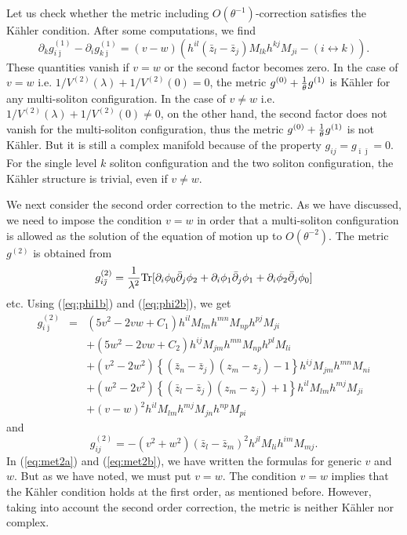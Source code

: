 \documentclass[a4paper,12pt]{article}
\begin{document}
Let us check whether the metric including
$O(\theta^{-1})$-correction
satisfies the K\"ahler condition.
After some computations, we find
\begin{equation}
\partial_{k}g^{(1)}_{i\bar{\jmath}}-\partial_{i} g^{(1)}_{k\bar{\jmath}}
=(v-w)\left( h^{il}(\bar{z}_{l}-\bar{z}_{j})M_{lk}h^{kj}M_{ji}
-(i\leftrightarrow k)
\right) .
\end{equation}
These quantities vanish if $v=w$  or the second factor becomes zero.
In the case of $v=w$ i.e. $1/V^{(2)}(\lambda)+1/V^{(2)}(0)=0$,
the metric $g^{(0)}+{1\over\theta}g^{(1)}$ is K\"ahler
for any multi-soliton configuration.
In the case of $v\neq w$ i.e. $1/V^{(2)}(\lambda)+1/V^{(2)}(0)\neq 0$,
on the other hand,
the second factor does not vanish for the multi-soliton configuration,
thus the metric $g^{(0)}+{1\over\theta}g^{(1)}$ is not K\"ahler.
But it is still a complex manifold because of the property
$g_{ij}=g_{\bar{\imath}\bar{\jmath}}=0$.
For the single level $k$ soliton configuration
and the two soliton configuration,
the K\"ahler structure is trivial,
even if $v\neq w$.

We next consider the second order correction to the metric.
As we have discussed, we need to impose the condition $v=w$
in order that a multi-soliton configuration is allowed
as the solution of the equation of motion up to $O(\theta^{-2})$.
The metric $g^{(2)}$ is obtained from
\begin{equation}
 g^{(2)}_{i\bar{\jmath}}={1\over\lambda^2}{\rm Tr}
[\partial_{i}\phi_{0}\bar{\partial}_{j}\phi_{2}
+\partial_{i}\phi_{1}\bar{\partial}_{j}\phi_{1}
+\partial_{i}\phi_{2}\bar{\partial}_{j}\phi_{0}]
\end{equation}
etc.
Using (\ref{eq:phi1b}) and (\ref{eq:phi2b}), we get
\begin{eqnarray}
 g^{(2)}_{i\bar{\jmath}}&=&
\left(
5v^2-2vw+C_{1}
\right) h^{il}M_{lm}h^{mn} M_{np} h^{pj}M_{ji}
\nonumber\\
&& +
\left(
5w^2-2vw+C_{2}
\right) h^{ij}M_{jm}h^{mn}M_{np}h^{pl}M_{li}
\nonumber\\
&& +
(v^2-2w^2) \left\{ (\bar{z}_{n}-\bar{z}_{j})(z_{m}-z_{j})-1\right\}
h^{ij} M_{jm}h^{mn}M_{ni}
\nonumber\\
&&
+(w^2-2v^2) \left\{ (\bar{z}_{l}-\bar{z}_{j})(z_{m}-z_{j})+1\right\}
h^{il} M_{lm}h^{mj}M_{ji}
\nonumber\\
&& +
(v-w)^2 h^{il}M_{lm}h^{mj}M_{jn}h^{np}M_{pi}
\label{eq:met2a}
\end{eqnarray}
and
\begin{equation}
 g^{(2)}_{ij}=-(v^2+w^2)
(\bar{z}_{l}-\bar{z}_{m})^2h^{jl}M_{li}h^{im}M_{mj}.
\label{eq:met2b}
\end{equation}
In (\ref{eq:met2a}) and (\ref{eq:met2b}), we have written the formulas
for generic $v$ and $w$. But as we have noted, we must put $v=w$.
The condition $v=w$ implies that
the K\"ahler condition holds at the first order,
as mentioned before.
However, taking into account the second order correction,
the metric is neither K\"ahler nor complex.
\end{document}
